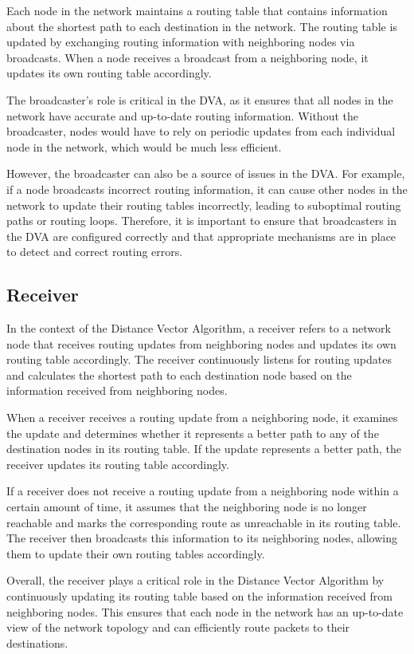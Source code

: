 \documentclass[11pt]{article}
\begin{document}
Each node in the network maintains a routing table that contains information about the shortest path to each destination in the network. The routing table is updated by exchanging routing information with neighboring nodes via broadcasts. When a node receives a broadcast from a neighboring node, it updates its own routing table accordingly.

The broadcaster's role is critical in the DVA, as it ensures that all nodes in the network have accurate and up-to-date routing information. Without the broadcaster, nodes would have to rely on periodic updates from each individual node in the network, which would be much less efficient.

However, the broadcaster can also be a source of issues in the DVA. For example, if a node broadcasts incorrect routing information, it can cause other nodes in the network to update their routing tables incorrectly, leading to suboptimal routing paths or routing loops. Therefore, it is important to ensure that broadcasters in the DVA are configured correctly and that appropriate mechanisms are in place to detect and correct routing errors.


\subsection{Receiver}

In the context of the Distance Vector Algorithm, a receiver refers to a network node that receives routing updates from neighboring nodes and updates its own routing table accordingly. The receiver continuously listens for routing updates and calculates the shortest path to each destination node based on the information received from neighboring nodes.

When a receiver receives a routing update from a neighboring node, it examines the update and determines whether it represents a better path to any of the destination nodes in its routing table. If the update represents a better path, the receiver updates its routing table accordingly.

If a receiver does not receive a routing update from a neighboring node within a certain amount of time, it assumes that the neighboring node is no longer reachable and marks the corresponding route as unreachable in its routing table. The receiver then broadcasts this information to its neighboring nodes, allowing them to update their own routing tables accordingly.

Overall, the receiver plays a critical role in the Distance Vector Algorithm by continuously updating its routing table based on the information received from neighboring nodes. This ensures that each node in the network has an up-to-date view of the network topology and can efficiently route packets to their destinations.
\end{document}
